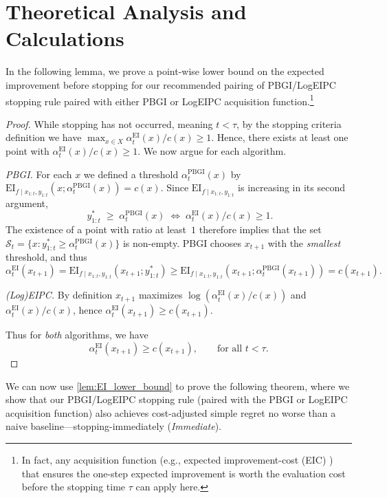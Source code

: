 \section{Theoretical Analysis and Calculations} \label{apdx:theory}
In the following lemma, we prove a point-wise lower bound on the expected improvement before stopping for our recommended pairing of PBGI/LogEIPC stopping rule paired with either PBGI or LogEIPC acquisition function.\footnote{In fact, any acquisition function (e.g., expected improvement-cost (EIC) \citep{hu2025adjusted}) that ensures the one-step expected improvement is worth the evaluation cost before the stopping time $\tau$ can apply here.}

\LemEIlb*

\begin{proof}
While stopping has not occurred, meaning $t<\tau$, by the stopping criteria definition we have $\max_{x\in X}\alpha_{t}^{\mathrm{EI}}(x)/c(x)\ge1$.
Hence, there exists at least one point with
$\alpha_{t}^{\mathrm{EI}}(x)/c(x)\ge1$.
We now argue for each algorithm.

\smallskip
\textit{PBGI.}
For each $x$ we defined a threshold $\alpha_{t}^{\mathrm{PBGI}}(x)$ by
$\mathrm{EI}_{f \mid x_{1:t}, y_{1:t}}\left(x; \alpha_{t}^{\mathrm{PBGI}}(x)\right)=c(x)$.
Since $\mathrm{EI}_{f \mid x_{1:t}, y_{1:t}}$ is increasing in its second argument,
\begin{equation}
\;y_{1:t}^*\;\ge\;\alpha_{t}^{\mathrm{PBGI}}(x)\;\Longleftrightarrow\;
\alpha_{t}^{\mathrm{EI}}(x)/c(x)\ge1.
\end{equation}
The existence of a point with ratio at least~$1$ therefore implies that the set
$
\mathcal S_{t}=\{x: y_{1:t}^*\ge \alpha_{t}^{\mathrm{PBGI}}(x)\}
$
is non-empty. PBGI chooses $x_{t+1}$ with the \emph{smallest} threshold,
and thus
\begin{equation}
\alpha_{t}^{\mathrm{EI}}(x_{t+1})=\mathrm{EI}_{f \mid x_{1:t}, y_{1:t}}\left(x_{t+1}; y_{1:t}^*\right)\ge\mathrm{EI}_{f \mid x_{1:t}, y_{1:t}}\left(x_{t+1}; \alpha_{t}^{\mathrm{PBGI}}(x_{t+1})\right)=c(x_{t+1}).
\end{equation}

\smallskip
\textit{(Log)EIPC.}
By definition $x_{t+1}$ maximizes $\log(\alpha_{t}^{\mathrm{EI}}(x)/c(x))$ and  $\alpha_{t}^{\mathrm{EI}}(x)/c(x)$, hence 
$\alpha_{t}^{\mathrm{EI}}(x_{t+1})\ge c(x_{t+1})$.

\smallskip
Thus for \emph{both} algorithms, we have
\begin{equation}
\label{eq:key-LB}
\alpha_{t}^{\mathrm{EI}}(x_{t+1})\ge c(x_{t+1}),
\qquad\text{for all }t < \tau.
\end{equation}
\end{proof}
We can now use \cref{lem:EI_lower_bound} to prove the following theorem, where we show that our PBGI/LogEIPC stopping rule (paired with the PBGI or LogEIPC acquisition function) also achieves cost-adjusted simple regret no worse than a naive baseline---stopping-immediately (\emph{Immediate}).

